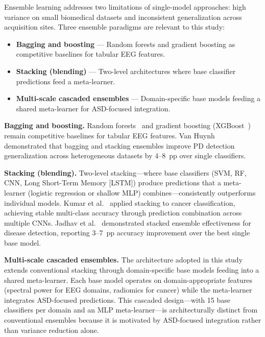 Ensemble learning addresses two limitations of single-model approaches: high variance on small biomedical datasets and inconsistent generalization across acquisition sites. Three ensemble paradigms are relevant to this study:

\begin{itemize}[leftmargin=*, itemsep=2pt]
  \item \textbf{Bagging and boosting} --- Random forests and gradient boosting as competitive baselines for tabular EEG features.
  \item \textbf{Stacking (blending)} --- Two-level architectures where base classifier predictions feed a meta-learner.
  \item \textbf{Multi-scale cascaded ensembles} --- Domain-specific base models feeding a shared meta-learner for ASD-focused integration.
\end{itemize}

\textbf{Bagging and boosting.} Random forests~\cite{breiman2001randomforests} and gradient boosting (XGBoost~\cite{chen2016xgboost}) remain competitive baselines for tabular EEG features. Van Huynh~\cite{vanhuynh2023ensemble} demonstrated that bagging and stacking ensembles improve PD detection generalization across heterogeneous datasets by 4--8~pp over single classifiers.

\textbf{Stacking (blending).} Two-level stacking---where base classifiers (SVM, RF, CNN, Long Short-Term Memory [LSTM]) produce predictions that a meta-learner (logistic regression or shallow MLP) combines---consistently outperforms individual models. Kumar et al.~\cite{kumar2023ensemble} applied stacking to cancer classification, achieving stable multi-class accuracy through prediction combination across multiple CNNs. Jadhav et al.~\cite{jadhav2023stacked} demonstrated stacked ensemble effectiveness for disease detection, reporting 3--7~pp accuracy improvement over the best single base model.

\textbf{Multi-scale cascaded ensembles.} The architecture adopted in this study extends conventional stacking through domain-specific base models feeding into a shared meta-learner. Each base model operates on domain-appropriate features (spectral power for EEG domains, radiomics for cancer) while the meta-learner integrates ASD-focused predictions. This cascaded design---with 15 base classifiers per domain and an MLP meta-learner---is architecturally distinct from conventional ensembles because it is motivated by ASD-focused integration rather than variance reduction alone.

